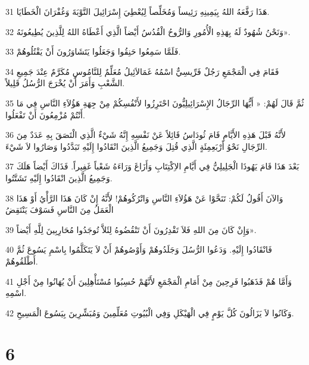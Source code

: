 \par 31 هَذَا رَفَّعَهُ اللهُ بِيَمِينِهِ رَئِيساً وَمُخَلِّصاً لِيُعْطِيَ إِسْرَائِيلَ التَّوْبَةَ وَغُفْرَانَ الْخَطَايَا.
\par 32 وَنَحْنُ شُهُودٌ لَهُ بِهَذِهِ الْأُمُورِ وَالرُّوحُ الْقُدُسُ أَيْضاً الَّذِي أَعْطَاهُ اللهُ لِلَّذِينَ يُطِيعُونَهُ».
\par 33 فَلَمَّا سَمِعُوا حَنِقُوا وَجَعَلُوا يَتَشَاوَرُونَ أَنْ يَقْتُلُوهُمْ.
\par 34 فَقَامَ فِي الْمَجْمَعِ رَجُلٌ فَرِّيسِيٌّ اسْمُهُ غَمَالاَئِيلُ مُعَلِّمٌ لِلنَّامُوسِ مُكَرَّمٌ عِنْدَ جَمِيعِ الشَّعْبِ وَأَمَرَ أَنْ يُخْرَجَ الرُّسُلُ قَلِيلاً.
\par 35 ثُمَّ قَالَ لَهُمْ: « أَيُّهَا الرِّجَالُ الإِسْرَائِيلِيُّونَ احْتَرِزُوا لأَنْفُسِكُمْ مِنْ جِهَةِ هَؤُلاَءِ النَّاسِ فِي مَا أَنْتُمْ مُزْمِعُونَ أَنْ تَفْعَلُوا.
\par 36 لأَنَّهُ قَبْلَ هَذِهِ الأَيَّامِ قَامَ ثُودَاسُ قَائِلاً عَنْ نَفْسِهِ إِنَّهُ شَيْءٌ الَّذِي الْتَصَقَ بِهِ عَدَدٌ مِنَ الرِّجَالِ نَحْوُ أَرْبَعِمِئَةٍ الَّذِي قُتِلَ وَجَمِيعُ الَّذِينَ انْقَادُوا إِلَيْهِ تَبَدَّدُوا وَصَارُوا لاَ شَيْءَ.
\par 37 بَعْدَ هَذَا قَامَ يَهُوذَا الْجَلِيلِيُّ فِي أَيَّامِ الاِكْتِتَابِ وَأَزَاغَ وَرَاءَهُ شَعْباً غَفِيراً. فَذَاكَ أَيْضاً هَلَكَ وَجَمِيعُ الَّذِينَ انْقَادُوا إِلَيْهِ تَشَتَّتُوا.
\par 38 وَالآنَ أَقُولُ لَكُمْ: تَنَحَّوْا عَنْ هَؤُلاَءِ النَّاسِ وَاتْرُكُوهُمْ! لأَنَّهُ إِنْ كَانَ هَذَا الرَّأْيُ أَوْ هَذَا الْعَمَلُ مِنَ النَّاسِ فَسَوْفَ يَنْتَقِضُ
\par 39 وَإِنْ كَانَ مِنَ اللهِ فَلاَ تَقْدِرُونَ أَنْ تَنْقُضُوهُ لِئَلاَّ تُوجَدُوا مُحَارِبِينَ لِلَّهِ أَيْضاً».
\par 40 فَانْقَادُوا إِلَيْهِ. وَدَعُوا الرُّسُلَ وَجَلَدُوهُمْ وَأَوْصُوهُمْ أَنْ لاَ يَتَكَلَّمُوا بِاسْمِ يَسُوعَ ثُمَّ أَطْلَقُوهُمْ.
\par 41 وَأَمَّا هُمْ فَذَهَبُوا فَرِحِينَ مِنْ أَمَامِ الْمَجْمَعِ لأَنَّهُمْ حُسِبُوا مُسْتَأْهِلِينَ أَنْ يُهَانُوا مِنْ أَجْلِ اسْمِهِ.
\par 42 وَكَانُوا لاَ يَزَالُونَ كُلَّ يَوْمٍ فِي الْهَيْكَلِ وَفِي الْبُيُوتِ مُعَلِّمِينَ وَمُبَشِّرِينَ بِيَسُوعَ الْمَسِيحِ.

\chapter{6}

